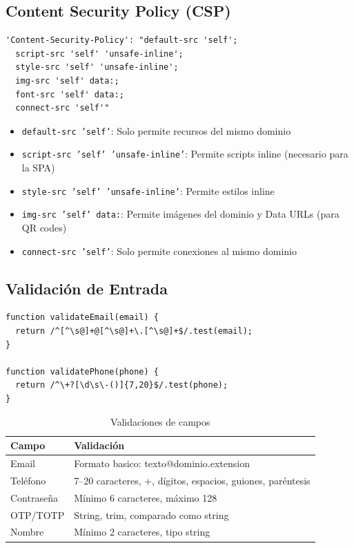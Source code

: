 \documentclass[12pt,a4paper,openany]{article}
\begin{document}
\subsection{Content Security Policy (CSP)}

\begin{lstlisting}[style=jsstyle, caption={Política CSP implementada}]
'Content-Security-Policy': "default-src 'self'; 
  script-src 'self' 'unsafe-inline'; 
  style-src 'self' 'unsafe-inline'; 
  img-src 'self' data:; 
  font-src 'self' data:; 
  connect-src 'self'"
\end{lstlisting}

\begin{itemize}[leftmargin=*]
    \item \texttt{default-src 'self'}: Solo permite recursos del mismo dominio
    \item \texttt{script-src 'self' 'unsafe-inline'}: Permite scripts inline (necesario para la SPA)
    \item \texttt{style-src 'self' 'unsafe-inline'}: Permite estilos inline
    \item \texttt{img-src 'self' data:}: Permite imágenes del dominio y Data URLs (para QR codes)
    \item \texttt{connect-src 'self'}: Solo permite conexiones al mismo dominio
\end{itemize}

\subsection{Validación de Entrada}

\begin{lstlisting}[style=jsstyle, caption={Validaciones de entrada}]
function validateEmail(email) {
  return /^[^\s@]+@[^\s@]+\.[^\s@]+$/.test(email);
}

function validatePhone(phone) {
  return /^\+?[\d\s\-()]{7,20}$/.test(phone);
}
\end{lstlisting}

\begin{table}[H]
\centering
\caption{Validaciones de campos}
\begin{tabular}{@{}ll@{}}
\toprule
\textbf{Campo} & \textbf{Validación} \\
\midrule
Email & Formato basico: texto@dominio.extension \\
Teléfono & 7--20 caracteres, +, dígitos, espacios, guiones, paréntesis \\
Contraseña & Mínimo 6 caracteres, máximo 128 \\
OTP/TOTP & String, trim, comparado como string \\
Nombre & Mínimo 2 caracteres, tipo string \\
\bottomrule
\end{tabular}
\end{table}
\end{document}
